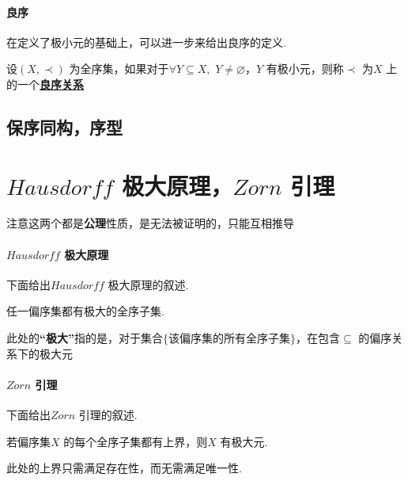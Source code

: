 \paragraph{良序}
	在定义了极小元的基础上，可以进一步来给出良序的定义.
	\begin{defn}\label{def 1.3.7}
		设$(X , \prec)$ 为全序集，如果对于$\forall Y \subseteq X , \,\, Y \neq \varnothing$，$Y$ 有极小元，则称$\prec$ 为$X$ 上的一个\underline{\textbf{良序关系}}
	\end{defn}
	
\subsection{保序同构，序型}





\newpage
\section{$Hausdorff$ 极大原理，$Zorn$ 引理}
	\begin{center}
		注意这两个都是\textbf{公理}性质，是无法被证明的，只能互相推导
	\end{center}

\paragraph{$Hausdorff$ 极大原理}
	下面给出$Hausdorff$ 极大原理的叙述.
	\begin{thm}\label{thm 1.4.1}
		任一偏序集都有极大的全序子集.
		\begin{rmk}
			此处的\textbf{“极大”}指的是，对于集合$\{ \text{该偏序集的所有全序子集} \}$，在包含$\subseteq$ 的偏序关系下的极大元
		\end{rmk}
	\end{thm}

\vspace*{2em}
\paragraph{$Zorn$ 引理}
	下面给出$Zorn$ 引理的叙述.
	\begin{thm}\label{thm 1.4.2}
		若偏序集$X$ 的每个全序子集都有上界，则$X$ 有极大元.
		\begin{rmk}
			此处的上界只需满足存在性，而无需满足唯一性.
		\end{rmk}
	\end{thm}

\vspace*{2em}
